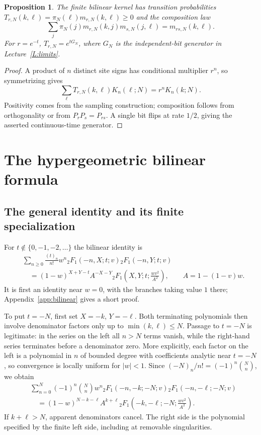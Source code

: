 \documentclass[11pt,reqno]{amsart}
\newtheorem{proposition}[theorem]{Proposition}
\theoremstyle{definition}
\theoremstyle{remark}
\begin{document}
\begin{proposition}\label{prop:finmehler}
The finite bilinear kernel has transition probabilities
$T_{r,N}(k,\ell)=\pi_N(\ell)m_{r,N}(k,\ell)\ge0$ and the composition law
\[
\sum_j\pi_N(j)m_{r,N}(k,j)m_{s,N}(j,\ell)=m_{rs,N}(k,\ell).
\]
For $r=e^{-t}$, $T_{r,N}=e^{tG_N}$, where $G_N$ is the independent-bit
generator in Lecture~\ref{L:limits}.
\end{proposition}
\begin{proof}
A product of $n$ distinct site signs has conditional multiplier $r^n$,
so symmetrizing gives
\begin{equation}\label{eq:tensoreigen}
\sum_\ell T_{r,N}(k,\ell)K_n(\ell;N)=r^nK_n(k;N).
\end{equation}
Positivity comes from the sampling construction; composition follows
from orthogonality or from $P_rP_s=P_{rs}$. A single bit flips at rate
$1/2$, giving the asserted continuous-time generator.
\end{proof}

\section{The hypergeometric bilinear formula}\label{L:kernels}
\subsection{The general identity and its finite specialization}
For $t\notin\{0,-1,-2,\ldots\}$ the bilinear identity is
\begin{equation}\label{eq:general-bilinear}
\begin{aligned}
&\sum_{n\ge0}\frac{(t)_n}{n!}w^n
{}_2F_1(-n,X;t;v){}_2F_1(-n,Y;t;v)\\
&\quad=(1-w)^{X+Y-t}A^{-X-Y}
{}_2F_1\left(X,Y;t;\frac{wv^2}{A^2}\right),\qquad
A=1-(1-v)w.
\end{aligned}
\end{equation}
It is first an identity near $w=0$, with the branches taking value $1$
there; Appendix~\ref{app:bilinear} gives a short proof.

To put $t=-N$, first set $X=-k$, $Y=-\ell$. Both terminating
polynomials then involve denominator factors only up to
$\min(k,\ell)\le N$. Passage to $t=-N$ is legitimate: in the series on
the left all $n>N$ terms vanish, while the right-hand series terminates
before a denominator zero. More explicitly, each factor on the left
is a polynomial in $n$ of bounded degree with coefficients analytic
near $t=-N$, so convergence is locally uniform for $|w|<1$.
Since $(-N)_n/n!=(-1)^n\binom Nn$, we obtain
\begin{equation}\label{eq:finite-v}
\begin{aligned}
&\sum_{n=0}^N(-1)^n\binom Nn w^n
{}_2F_1(-n,-k;-N;v){}_2F_1(-n,-\ell;-N;v)\\
&\quad=(1-w)^{N-k-\ell}A^{k+\ell}
{}_2F_1\left(-k,-\ell;-N;\frac{wv^2}{A^2}\right).
\end{aligned}
\end{equation}
If $k+\ell>N$, apparent denominators cancel. The right side is the
polynomial specified by the finite left side, including at removable
singularities.
\end{document}
